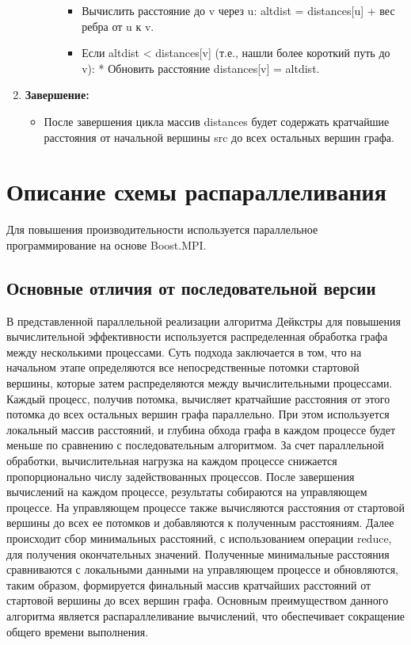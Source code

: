 \documentclass[12pt]{article}
\begin{document}
\begin{enumerate}
\begin{itemize}
\begin{itemize}
\begin{itemize}
                            \item Вычислить расстояние до v через u: altdist = distances[u] + вес ребра от u к v.
                            \item Если altdist < distances[v] (т.е., нашли более короткий путь до v): * Обновить расстояние distances[v] = altdist.
                        \end{itemize}
                  \end{itemize}
             \end{itemize}
    \item \textbf{Завершение:}                          
        \begin{itemize}
            \item После завершения цикла массив distances будет содержать кратчайшие расстояния от начальной вершины src до всех остальных вершин графа.
        \end{itemize}

\end{enumerate}
\newpage

\section*{Описание схемы распараллеливания}
Для повышения производительности используется параллельное программирование на основе Boost.MPI.

\subsection*{Основные отличия от последовательной версии}
В представленной параллельной реализации алгоритма Дейкстры для повышения вычислительной эффективности используется распределенная обработка графа между несколькими процессами. Суть подхода заключается в том, что на начальном этапе определяются все непосредственные потомки стартовой вершины, которые затем распределяются между вычислительными процессами. Каждый процесс, получив потомка, вычисляет кратчайшие расстояния от этого потомка до всех остальных вершин графа параллельно. При этом используется локальный массив расстояний, и глубина обхода графа в каждом процессе будет меньше по сравнению с последовательным алгоритмом. За счет параллельной обработки, вычислительная нагрузка на каждом процессе снижается пропорционально числу задействованных процессов. После завершения вычислений на каждом процессе, результаты собираются на управляющем процессе. На управляющем процессе также вычисляются расстояния от стартовой вершины до всех ее потомков и добавляются к полученным расстояниям. Далее происходит сбор минимальных расстояний, с использованием операции reduce, для получения окончательных значений. Полученные минимальные расстояния сравниваются с локальными данными на управляющем процессе и обновляются, таким образом, формируется финальный массив кратчайших расстояний от стартовой вершины до всех вершин графа. Основным преимуществом данного алгоритма является распараллеливание вычислений, что обеспечивает сокращение общего времени выполнения.
\end{document}
